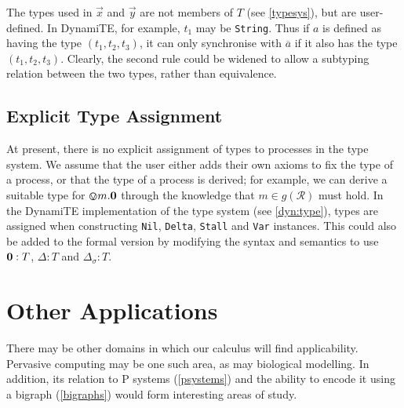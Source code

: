 The types used in $\vec{x}$ and $\vec{y}$ are not members of $T$ (see
\ref{typesys}), but are user-defined.  In DynamiTE, for example, $t_1$
may be \texttt{String}.  Thus if $a$ is defined as having the type
$(t_1, t_2, t_3)$, it can only synchronise with $\overline{a}$ if it
also has the type $(t_1, t_2, t_3)$.  Clearly, the second rule could
be widened to allow a subtyping relation between the two types, rather
than equivalence.

\subsection{Explicit Type Assignment}

At present, there is no explicit assignment of types to processes in
the type system.  We assume that the user either adds their own axioms
to fix the type of a process, or that the type of a process is
derived; for example, we can derive a suitable type for
$\varovee m.\textbf{0}$ through the knowledge that $m \in g(\mathscr{R})$
must hold.  In the DynamiTE implementation of the type system (see
\ref{dyn:type}), types are assigned when constructing \texttt{Nil},
\texttt{Delta}, \texttt{Stall} and \texttt{Var} instances.  This could
also be added to the formal version by modifying the syntax and
semantics to use $\textbf{0} : T$, $\Delta : T$ and $\Delta_\sigma : T$.

\section{Other Applications}
\label{future:apps}

There may be other domains in which our calculus will find
applicability.  Pervasive computing may be one such area, as may
biological modelling.  In addition, its relation to P systems
(\ref{psystems}) and the ability to encode it using a bigraph
(\ref{bigraphs}) would form interesting areas of study.
